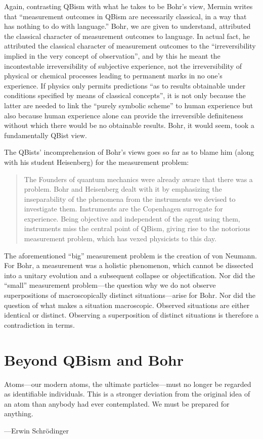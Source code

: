 \documentclass[smallextended]{svjour3}
\newcommand{\bq}{\begin{quote}}
\newcommand{\eq}{\end{quote}}
\begin{document}
Again, contrasting QBism with what he takes to be Bohr's view, Mermin writes that ``measurement outcomes in QBism are necessarily classical, in a way that has nothing to do with language.'' Bohr, we are given to understand, attributed the classical character of measurement outcomes to language. In actual fact, he attributed the classical character of measurement outcomes to the ``irreversibility implied in the very concept of observation'',\cite{BohrE58-62p92} and by this he meant the incontestable irreversibility of subjective experience, not the irreversibility of physical or chemical processes leading to permanent marks in no one's experience. If physics only permits predictions ``as to results obtainable under conditions specified by means of classical concepts'',\cite{Bohr-APHKa} it is not only because the latter are needed to link the ``purely symbolic scheme'' to human experience but also because human experience alone can provide the irreversible definiteness without which there would be no obtainable results. Bohr, it would seem, took a fundamentally QBist view.

The QBists' incomprehension of Bohr's views goes so far as to blame him (along with his student Heisenberg) for the measurement problem: 
\bq
The Founders of quantum mechanics were already aware that there was a problem. Bohr and Heisenberg dealt with it by emphasizing the inseparability of the phenomena from the instruments we devised to investigate them. Instruments are the Copenhagen surrogate for experience. Being objective and independent of the agent using them, instruments miss the central point of QBism, giving rise to the notorious measurement problem, which has vexed physicists to this day. \cite{FMS2014}
\eq
The aforementioned ``big'' measurement problem is the creation of von Neumann.\cite{vN} For Bohr, a measurement was a holistic phenomenon, which cannot be dissected into a unitary evolution and a subsequent collapse or objectification. Nor did the ``small'' measurement problem\cite{Pitowsky2006}---the question why we do not observe superpositions of macroscopically distinct situations---arise for Bohr. Nor did the question of what makes a situation macroscopic.  Observed situations are either identical or distinct. Observing a superposition of distinct situations is therefore a contradiction in terms.


\section{Beyond QBism and Bohr}\label{sec.beyondQBB}
{\leftskip\parindent\small Atoms---our modern atoms, the ultimate particles---must no longer be regarded as identifiable individuals. This is a stronger deviation from the original idea of an atom than anybody had ever contemplated. We must be prepared for anything.\par\hfill---Erwin Schr\"odinger\cite{SchrNGSH}\par}\medskip
\end{document}
